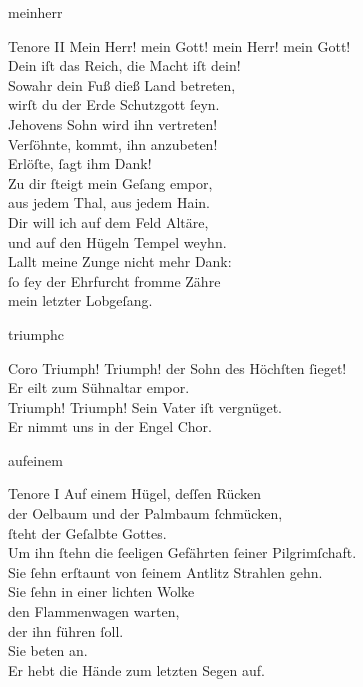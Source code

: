 \documentclass[tocstyle=ref-genre]{ees}
\begin{document}
{\begin{movement}{meinherr}
  \item[Tenore II]
  Mein Herr! mein Gott! mein Herr! mein Gott!\\
  Dein iſt das Reich, die Macht iſt dein!\\
  Sowahr dein Fuß dieß Land betreten,\\
  wirſt du der Erde Schutzgott ſeyn.\\
  Jehovens Sohn wird ihn vertreten!\\
  Verſöhnte, kommt, ihn anzubeten!\\
  Erlöſte, ſagt ihm Dank!\\
  Zu dir ſteigt mein Geſang empor,\\
  aus jedem Thal, aus jedem Hain.\\
  Dir will ich auf dem Feld Altäre,\\
  und auf den Hügeln Tempel weyhn.\\
  Lallt meine Zunge nicht mehr Dank:\\
  ſo ſey der Ehrfurcht fromme Zähre\\
  mein letzter Lobgeſang.
\end{movement}

\begin{movement}{triumphc}
  \item[Coro]
  Triumph! Triumph! der Sohn des Höchſten ſieget!\\
  Er eilt zum Sühnaltar empor.\\
  Triumph! Triumph! Sein Vater iſt vergnüget.\\
  Er nimmt uns in der Engel Chor.
\end{movement}

\begin{movement}{aufeinem}
  \item[Tenore I]
  Auf einem Hügel, deſſen Rücken\\
  der Oelbaum und der Palmbaum ſchmücken,\\
  ſteht der Geſalbte Gottes.\\
  Um ihn ſtehn die ſeeligen Gefährten ſeiner Pilgrimſchaft.\\
  Sie ſehn erſtaunt von ſeinem Antlitz Strahlen gehn.\\
  Sie ſehn in einer lichten Wolke\\
  den Flammenwagen warten,\\
  der ihn führen ſoll.\\
  Sie beten an.\\
  Er hebt die Hände zum letzten Segen auf.


\end{movement}}
\end{document}
